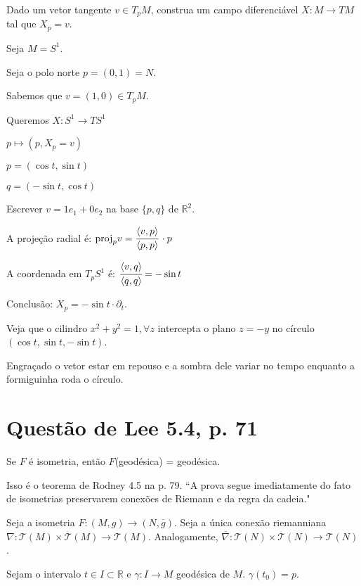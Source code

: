 \documentclass[10pt,a4paper]{article}
\begin{document}
		Dado um vetor tangente $v \in T_pM$, construa um campo diferenci\'avel $X: M \rightarrow TM$ tal que $X_p = v$.

		Seja $M = S^1$.

		Seja o polo norte $p = (0,1) = N$.

		Sabemos que $v = (1, 0) \in T_pM$.

		Queremos $X : S^1 \rightarrow TS^1$

		$p \mapsto (p, X_p = v)$

		$p = (\cos t, \sin t)$

		$q = (-\sin t, \cos t)$

		Escrever $v = 1 e_1 + 0 e_2$ na base $\{ p, q \}$ de $\mathbb{R}^2$.

		A proje\c{c}\~ao radial \'e: $\text{proj}_p v = \cfrac{\langle v, p \rangle}{\langle p, p \rangle}\,\cdot p$

		A coordenada em $T_pS^1$ \'e: $\cfrac{\langle v, q \rangle}{\langle q, q \rangle} = - \sin t$

		Conclus\~ao: $X_p = - \sin t \cdot \partial_t$.

		Veja que o cilindro $x^2 + y^2 = 1, \forall z$ intercepta o plano $z = -y$ no c\'irculo $(\cos t, \sin t, -\sin t)$.

		Engra\c{c}ado o vetor estar em repouso e a sombra dele variar no tempo enquanto a formiguinha roda o c\'irculo.

	\section{Quest\~ao de Lee 5.4, p. 71}
		\begin{flushright}
		\end{flushright}

		Se $F$ \'e isometria, ent\~ao $F$(geod\'esica) = geod\'esica.

		Isso \'e o teorema de Rodney 4.5 na p. 79. ``A prova segue imediatamente do fato de isometrias preservarem conex\~oes de Riemann e da regra da cadeia."

		\vspace{3mm}

		Seja a isometria $F: (M, g) \rightarrow (N, \overline{g})$. Seja a \'unica conex\~ao riemanniana $\nabla: \mathcal{T}(M) \times \mathcal{T}(M) \rightarrow \mathcal{T}(M)$. Analogamente, $\overline{\nabla}: \mathcal{T}(N) \times \mathcal{T}(N) \rightarrow \mathcal{T}(N)$.

		Sejam o intervalo $t \in I \subset \mathbb{R}$ e $\gamma : I \rightarrow M$ geod\'esica de $M$. $\gamma(t_0) = p$.
\end{document}

